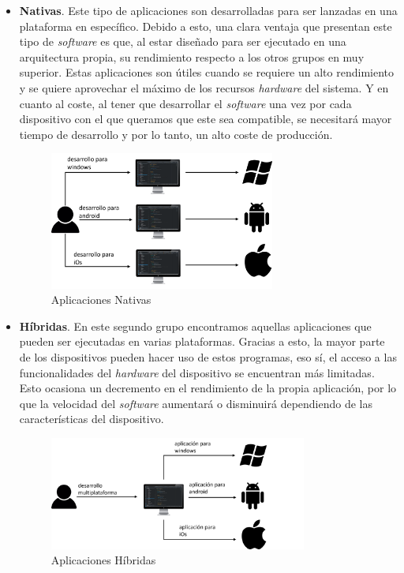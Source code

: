 \documentclass[../main.tex]{subfiles}
\begin{document}
\begin{itemize}

    \item \textbf{Nativas}. Este tipo de aplicaciones son desarrolladas para ser lanzadas en una plataforma en específico. Debido a esto, una clara ventaja que presentan este tipo de \textit{software} es que, al estar diseñado para ser ejecutado en una arquitectura propia, su rendimiento respecto a los otros grupos en muy superior. Estas aplicaciones son útiles cuando se requiere un alto rendimiento y se quiere aprovechar el máximo de los recursos \textit{hardware} del sistema. Y en cuanto al coste, al tener que desarrollar el \textit{software} una vez por cada dispositivo con el que queramos que este sea compatible, se necesitará mayor tiempo de desarrollo y por lo tanto, un alto coste de producción.
    
    \begin{figure}[!h]
          \centering
          \includegraphics[width=0.7\textwidth]{images/aplicaciones_nativas.png}
          \caption{Aplicaciones Nativas}
          \label{fig:aplicaciones_nativas}
      \end{figure}
    
    \item \textbf{Híbridas}. En este segundo grupo encontramos aquellas aplicaciones que pueden ser ejecutadas en varias plataformas. Gracias a esto, la mayor parte de los dispositivos pueden hacer uso de estos programas, eso sí, el acceso a las funcionalidades del \textit{hardware} del dispositivo se encuentran más limitadas. Esto ocasiona un decremento en el rendimiento de la propia aplicación, por lo que la velocidad del \textit{software} aumentará o disminuirá dependiendo de las características del dispositivo.
    
    \begin{figure}[!h]
          \centering
          \includegraphics[width=0.8\textwidth]{images/aplicaciones_hibridas.png}
          \caption{Aplicaciones Híbridas}
          \label{fig:aplicaciones_hibridas}
      \end{figure}
    

\end{itemize}
\end{document}
